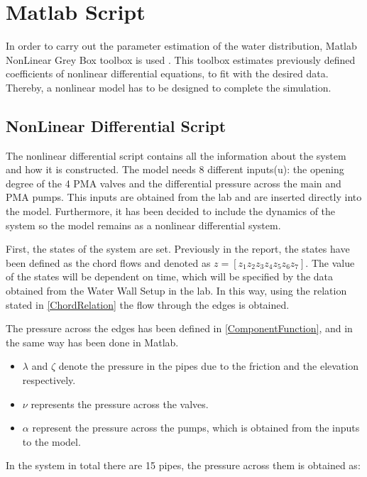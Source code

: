 \section{Matlab Script} 
\label{MatlabScript}

In order to carry out the parameter estimation of the water distribution, Matlab NonLinear Grey Box toolbox is used \cite{MatlabGreyBox}. This toolbox 
estimates previously defined coefficients of nonlinear differential equations, to fit with the desired data. 
Thereby, a nonlinear model has to be designed to complete the simulation. 

\subsection{NonLinear Differential Script}
\label{NLDS}
The nonlinear differential script contains all the information about the system and how it is constructed. The model needs 8 different inputs(u): 
the opening degree of the 4 PMA valves and the differential pressure across the main and PMA pumps. This inputs are obtained from the lab and are 
inserted directly into the model. Furthermore, it has been decided to include the dynamics of the system so the model remains as a nonlinear differential system. 

First, the states of the system are set. Previously in the report, the states have been defined as the chord flows and denoted as $z = [z_1 z_2 z_3 z_4 z_5 z_6 
z_7]$. The value of the states will be dependent on time, which will be specified by the data obtained from the Water Wall Setup in the lab. In this way, using
the relation stated in \eqref{ChordRelation} the flow through the edges is obtained.

The pressure across the edges has been defined in \eqref{ComponentFunction}, and in the same way has been done in Matlab. 

\begin{itemize}
  \item $\lambda$ and $\zeta$ denote the pressure in the pipes due to the friction and the elevation respectively.
  \item $\nu$ represents the pressure across the valves.
  \item $\alpha$ represent the pressure across the pumps, which is obtained from the inputs to the model.
\end{itemize}

In the system in total there are 15 pipes, the pressure across them is obtained as: 

